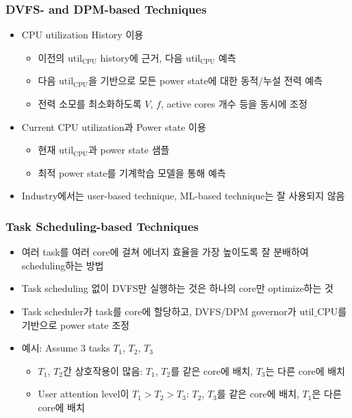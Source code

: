 \subsubsection*{DVFS- and DPM-based Techniques}
\begin{itemize}
    \item CPU utilization History 이용
    \begin{itemize}
        \item 이전의 $\mathrm{util_{CPU}}$ history에 근거, 다음 $\mathrm{util_{CPU}}$ 예측
        \item 다음 $\mathrm{util_{CPU}}$을 기반으로 모든 power state에 대한 동적/누설 전력 예측
        \item 전력 소모를 최소화하도록 $V$, $f$, active cores 개수 등을 동시에 조정
    \end{itemize}
    \item Current CPU utilization과 Power state 이용
    \begin{itemize}
        \item 현재 $\mathrm{util_{CPU}}$과 power state 샘플
        \item 최적 power state를 기계학습 모델을 통해 예측
    \end{itemize}
    \item Industry에서는 user-based technique, ML-based technique는 잘 사용되지 않음
\end{itemize}

\subsubsection*{Task Scheduling-based Techniques}
\begin{itemize}
    \item 여러 task를 여러 core에 걸쳐 에너지 효율을 가장 높이도록 잘 분배하여 scheduling하는 방법
    \item Task scheduling 없이 DVFS만 실행하는 것은 하나의 core만 optimize하는 것
    \item Task scheduler가 task를 core에 할당하고, DVFS/DPM governor가 $\mathrm{util\_{CPU}}$를 기반으로 power state 조정
    \item 예시: Assume 3 tasks $T_1$, $T_2$, $T_3$
    \begin{itemize}
        \item $T_1$, $T_2$간 상호작용이 많음: $T_1$, $T_2$를 같은 core에 배치, $T_3$는 다른 core에 배치
        \item User attention level이 $T_1>T_2>T_3$: $T_2$, $T_3$를 같은 core에 배치, $T_1$은 다른 core에 배치
    \end{itemize}
\end{itemize}

